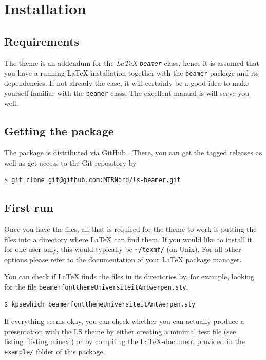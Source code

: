 \section{Installation}

\subsection{Requirements}
The theme is an addendum for the \emph{\LaTeX} \emph{\texttt{beamer}} class,
hence it is assumed that you have a running \LaTeX{} installation together with
the \texttt{beamer} package \cite{Miletic:2010:LBC} and its dependencies. If
not already the case, it will certainly be a good idea to make yourself
familiar with the \texttt{beamer} class. The excellent manual
\cite{TWM:2010:BCU} is will serve you well.

\subsection{Getting the package}

The package is distributed via GitHub \cite{GitHub:2011:lsbeamer}. There, you
can get the tagged releases as well as get access to the Git repository by
\begin{lstlisting}
$ git clone git@github.com:MTRNord/ls-beamer.git
\end{lstlisting}


\subsection{First run}
Once you have the files, all that is required for the theme to work is putting
the files into a directory where \LaTeX{} can find them. If you would like to
install it for one user only, this would typically be \lstinline{~/texmf/} (on
Unix). For all other options please refer to the documentation of your \LaTeX{}
package manager.

You can check if \LaTeX{} finds the files in its directories by, for example,
looking for the file \lstinline!beamerfontthemeUniversiteitAntwerpen.sty!,
\begin{lstlisting}
$ kpsewhich beamerfontthemeUniversiteitAntwerpen.sty
\end{lstlisting}

If everything seems okay, you can check whether you can actually produce a
presentation with the LS theme by either creating a minimal test file (see
listing~\ref{listing:minex}) or by compiling the \LaTeX-document provided in
the \lstinline!example/! folder of this package.


